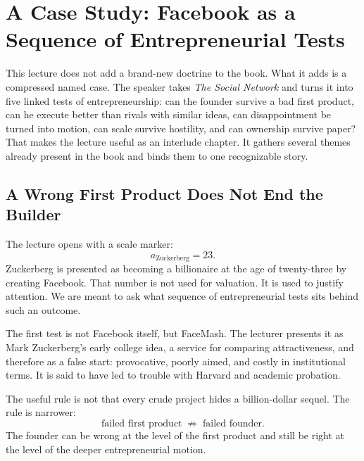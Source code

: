 \documentclass[11pt,oneside]{book}
\begin{document}

\chapter{A Case Study: Facebook as a Sequence of Entrepreneurial Tests}

This lecture does not add a brand-new doctrine to the book. What it adds is a compressed named case. The speaker takes \emph{The Social Network} and turns it into five linked tests of entrepreneurship: can the founder survive a bad first product, can he execute better than rivals with similar ideas, can disappointment be turned into motion, can scale survive hostility, and can ownership survive paper? That makes the lecture useful as an interlude chapter. It gathers several themes already present in the book and binds them to one recognizable story.

\section{A Wrong First Product Does Not End the Builder}

The lecture opens with a scale marker:
\begin{equation}
a_{\text{Zuckerberg}} = 23.
\end{equation}
Zuckerberg is presented as becoming a billionaire at the age of twenty-three by creating Facebook. That number is not used for valuation. It is used to justify attention. We are meant to ask what sequence of entrepreneurial tests sits behind such an outcome.

The first test is not Facebook itself, but FaceMash. The lecturer presents it as Mark Zuckerberg's early college idea, a service for comparing attractiveness, and therefore as a false start: provocative, poorly aimed, and costly in institutional terms. It is said to have led to trouble with Harvard and academic probation.

The useful rule is not that every crude project hides a billion-dollar sequel. The rule is narrower:
\begin{equation}
\text{failed first product}
\;\not\Longrightarrow\;
\text{failed founder}.
\end{equation}
The founder can be wrong at the level of the first product and still be right at the level of the deeper entrepreneurial motion.
\end{document}
